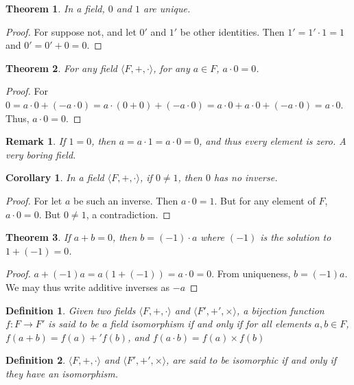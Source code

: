 \documentclass[oneside]{book}
\theoremstyle{mystyle}
\newtheorem{theorem}{Theorem}[section]
\newtheorem{definition}{Definition}[section]
\newtheorem{corollary}{Corollary}[section]
\newtheorem{remark}{Remark}[section]
\begin{document}
\begin{theorem}
In a field, $0$ and $1$ are unique.
\end{theorem}
\begin{proof}
For suppose not, and let $0'$ and $1'$ be other identities. Then $1'=1'\cdot 1 = 1$ and $0'=0'+0=0$.
\end{proof}

\begin{theorem}
For any field $\langle F,+,\cdot \rangle$, for any $a\in F$, $a\cdot 0 = 0$.
\end{theorem}
\begin{proof}
For $0 = a\cdot 0 + (-a\cdot 0) = a\cdot(0+0) +(-a\cdot 0) = a\cdot 0 + a\cdot 0 + (-a\cdot 0) = a\cdot 0$. Thus, $a\cdot 0 = 0$.
\end{proof}

\begin{remark}
If $1=0$, then $a=a\cdot 1 = a\cdot 0 = 0$, and thus every element is zero. A very boring field.
\end{remark}

\begin{corollary}
In a field $\langle F, +,\cdot \rangle$, if $0\ne 1$, then $0$ has no inverse.
\end{corollary}
\begin{proof}
For let $a$ be such an inverse. Then $a\cdot 0 = 1$. But for any element of $F$, $a \cdot 0 = 0$. But $0\ne 1$, a contradiction.
\end{proof}

\begin{theorem}
If $a+b = 0$, then $b= (-1)\cdot a$ where $(-1)$ is the solution to $1+(-1)=0$.
\end{theorem}
\begin{proof}
$a+(-1)a = a(1+(-1)) = a\cdot 0 = 0$. From uniqueness, $b=(-1)a$. We may thus write additive inverses as $-a$
\end{proof}

\begin{definition}
Given two fields $\langle F,+,\cdot \rangle$ and $\langle F', +',\times \rangle$, a bijection function $f:F\rightarrow F'$ is said to be a field isomorphism if and only if for all elements $a,b\in F$, $f(a+b)=f(a)+'f(b)$, and $f(a\cdot b) = f(a)\times f(b)$
\end{definition}

\begin{definition}
$\langle F,+,\cdot \rangle$ and $\langle F', +',\times \rangle$, are said to be isomorphic if and only if they have an isomorphism.
\end{definition}
\end{document}
